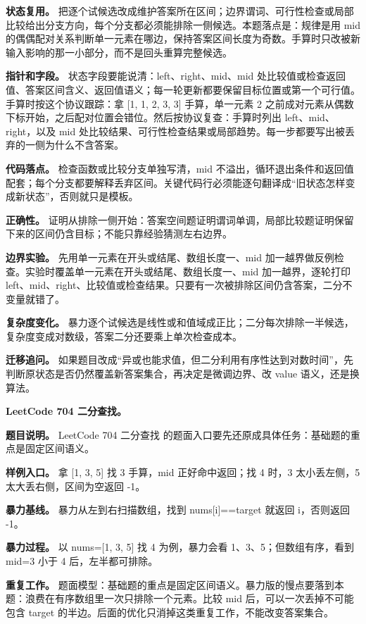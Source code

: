 \textbf{状态复用。} 把逐个试候选改成维护答案所在区间；边界谓词、可行性检查或局部比较给出分支方向，每个分支都必须能排除一侧候选。本题落点是：规律是用 mid 的偶偶配对关系判断单一元素在哪边，保持答案区间长度为奇数。手算时只改被新输入影响的那一小部分，而不是回头重算完整候选。

\textbf{指针和字段。} 状态字段要能说清：left、right、mid、mid 处比较值或检查返回值、答案区间含义、返回值语义；每一轮更新都要保留目标位置或第一个可行值。手算时按这个协议跟踪：拿 [1, 1, 2, 3, 3] 手算，单一元素 2 之前成对元素从偶数下标开始，之后配对位置会错位。然后按协议复查：手算时列出 left、mid、right，以及 mid 处比较结果、可行性检查结果或局部趋势。每一步都要写出被丢弃的一侧为什么不含答案。

\textbf{代码落点。} 检查函数或比较分支单独写清，mid 不溢出，循环退出条件和返回值配套；每个分支都要解释丢弃区间。关键代码行必须能逐句翻译成“旧状态怎样变成新状态”，否则就只是模板。

\textbf{正确性。} 证明从排除一侧开始：答案空间题证明谓词单调，局部比较题证明保留下来的区间仍含目标；不能只靠经验猜测左右边界。

\textbf{边界实验。} 先用单一元素在开头或结尾、数组长度一、mid 加一越界做反例检查。实验时覆盖单一元素在开头或结尾、数组长度一、mid 加一越界，逐轮打印 left、mid、right、比较值或检查结果。只要有一次被排除区间仍含答案，二分不变量就错了。

\textbf{复杂度变化。} 暴力逐个试候选是线性或和值域成正比；二分每次排除一半候选，复杂度变成对数级，答案二分还要乘上单次检查成本。

\textbf{迁移追问。} 如果题目改成“异或也能求值，但二分利用有序性达到对数时间”，先判断原状态是否仍然覆盖新答案集合，再决定是微调边界、改 value 语义，还是换算法。

\noindent\textbf{LeetCode 704 二分查找。}

\textbf{题目说明。} LeetCode 704 二分查找 的题面入口要先还原成具体任务：基础题的重点是固定区间语义。

\textbf{样例入口。} 拿 [1, 3, 5] 找 3 手算，mid 正好命中返回；找 4 时，3 太小丢左侧，5 太大丢右侧，区间为空返回 -1。

\textbf{暴力基线。} 暴力从左到右扫描数组，找到 nums[i]==target 就返回 i，否则返回 -1。

\textbf{暴力过程。} 以 nums=[1, 3, 5] 找 4 为例，暴力会看 1、3、5；但数组有序，看到 mid=3 小于 4 后，左半都可排除。

\textbf{重复工作。} 题面模型：基础题的重点是固定区间语义。暴力版的慢点要落到本题：浪费在有序数组里一次只排除一个元素。比较 mid 后，可以一次丢掉不可能包含 target 的半边。后面的优化只消掉这类重复工作，不能改变答案集合。

